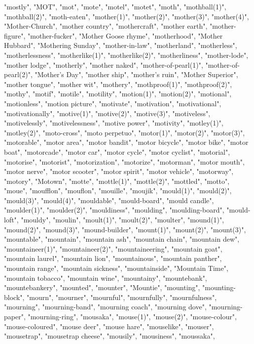 "mostly",
"MOT",
"mot",
"mote",
"motel",
"motet",
"moth",
"mothball(1)",
"mothball(2)",
"moth-eaten",
"mother(1)",
"mother(2)",
"mother(3)",
"mother(4)",
"Mother-Church",
"mother country",
"mothercraft",
"mother earth",
"mother-figure",
"mother-fucker",
"Mother Goose rhyme",
"motherhood",
"Mother Hubbard",
"Mothering Sunday",
"mother-in-law",
"motherland",
"motherless",
"motherlessness",
"motherlike(1)",
"motherlike(2)",
"motherliness",
"mother-lode",
"mother lodge",
"motherly",
"mother naked",
"mother-of-pearl(1)",
"mother-of-pearl(2)",
"Mother's Day",
"mother ship",
"mother's ruin",
"Mother Superior",
"mother tongue",
"mother wit",
"mothery",
"mothproof(1)",
"mothproof(2)",
"mothy",
"motif",
"motile",
"motility",
"motion(1)",
"motion(2)",
"motional",
"motionless",
"motion picture",
"motivate",
"motivation",
"motivational",
"motivationally",
"motive(1)",
"motive(2)",
"motive(3)",
"motiveless",
"motivelessly",
"motivelessness",
"motive power",
"motivity",
"motley(1)",
"motley(2)",
"moto-cross",
"moto perpetuo",
"motor(1)",
"motor(2)",
"motor(3)",
"motorable",
"motor area",
"motor bandit",
"motor bicycle",
"motor bike",
"motor boat",
"motorcade",
"motor car",
"motor cycle",
"motor cyclist",
"motorial",
"motorise",
"motorist",
"motorization",
"motorize",
"motorman",
"motor mouth",
"motor nerve",
"motor scooter",
"motor spirit",
"motor vehicle",
"motorway",
"motory",
"Motown",
"motte",
"mottle(1)",
"mottle(2)",
"mottled",
"motto",
"moue",
"moufflon",
"mouflon",
"mouille",
"moujik",
"mould(1)",
"mould(2)",
"mould(3)",
"mould(4)",
"mouldable",
"mould-board",
"mould candle",
"moulder(1)",
"moulder(2)",
"mouldiness",
"moulding",
"moulding-board",
"mould-loft",
"mouldy",
"moulin",
"moult(1)",
"moult(2)",
"moulter",
"mound(1)",
"mound(2)",
"mound(3)",
"mound-builder",
"mount(1)",
"mount(2)",
"mount(3)",
"mountable",
"mountain",
"mountain ash",
"mountain chain",
"mountain dew",
"mountaineer(1)",
"mountaineer(2)",
"mountaineering",
"mountain goat",
"mountain laurel",
"mountain lion",
"mountainous",
"mountain panther",
"mountain range",
"mountain sickness",
"mountainside",
"Mountain Time",
"mountain tobacco",
"mountain wine",
"mountainy",
"mountebank",
"mountebankery",
"mounted",
"mounter",
"Mountie",
"mounting",
"mounting-block",
"mourn",
"mourner",
"mournful",
"mournfully",
"mournfulness",
"mourning",
"mourning-band",
"mourning coach",
"mourning dove",
"mourning-paper",
"mourning-ring",
"mousaka",
"mouse(1)",
"mouse(2)",
"mouse-colour",
"mouse-coloured",
"mouse deer",
"mouse hare",
"mouselike",
"mouser",
"mousetrap",
"mousetrap cheese",
"mousily",
"mousiness",
"moussaka",
